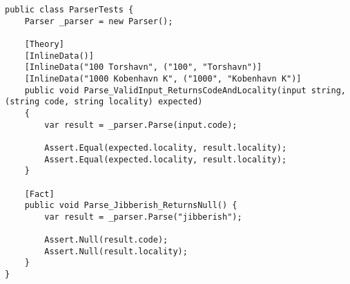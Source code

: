 \begin{lstlisting}
public class ParserTests {
    Parser _parser = new Parser();

    [Theory]
    [InlineData()]
    [InlineData("100 Torshavn", ("100", "Torshavn")]
    [InlineData("1000 Kobenhavn K", ("1000", "Kobenhavn K")]
    public void Parse_ValidInput_ReturnsCodeAndLocality(input string, (string code, string locality) expected)
    {
        var result = _parser.Parse(input.code);

        Assert.Equal(expected.locality, result.locality);
        Assert.Equal(expected.locality, result.locality);
    }

    [Fact]
    public void Parse_Jibberish_ReturnsNull() {
        var result = _parser.Parse("jibberish");

        Assert.Null(result.code);
        Assert.Null(result.locality);
    }
}
\end{lstlisting}
